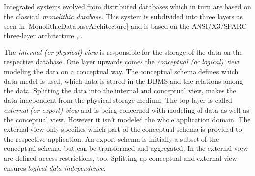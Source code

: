 
Integrated systems evolved from distributed databases which in turn are based on the classical \emph{monolithic database}. 
This system is subdivided into three layers as seen in \ref{MonolithicDatabaseArchitecture} and is based on the ANSI/X3/SPARC three-layer architecture \cite{TSICHRITZIS1978173}, \cite[p. 84/85]{DBLP:books/dp/LeserN2006}.

The \textit{internal (or physical) view} is responsible for the storage of the data on the respective database. 
One layer upwards comes the \textit{conceptual (or logical) view} modeling the data on a conceptual way. The conceptual schema defines which data model is used, which data is stored in the DBMS and the relations among the data.
Splitting the data into the internal and conceptual view, makes the data independent from the physical storage medium. The top layer is called \textit{external (or export) view} and is being concerned with modeling of data as well as the conceptual view. However it isn't modeled the whole application domain. The external view only specifies which part of the conceptual schema is provided to the respective application. An export schema is initially a subset of the conceptual schema, but can be transformed and aggregated. In the external view are defined access restrictions, too. Splitting up conceptual and external view ensures \textit{logical data independence}.

